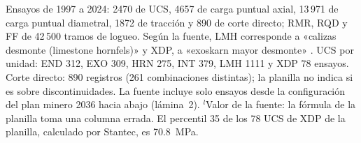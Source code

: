 \documentclass[11pt,letterpaper]{article}
\begin{document}
\begin{table}[H]
\begin{tabular}{llrrrrrrrrr}
\bottomrule\end{tabular}\par\vspace{3pt}\footnotesize Ensayos de 1997 a 2024: 2470 de UCS, 4657 de carga puntual axial, 13\,971 de carga puntual diametral, 1872 de tracción y 890 de corte directo; RMR, RQD y FF de 42\,500 tramos de logueo. Según la fuente, LMH corresponde a «calizas desmonte (limestone hornfels)» y XDP, a «exoskarn mayor desmonte» \citep[lámina~12]{antamina2025wsc}. UCS por unidad: END 312, EXO 309, HRN 275, INT 379, LMH 1111 y XDP 78 ensayos. Corte directo: 890 registros (261 combinaciones distintas); la planilla no indica si es sobre discontinuidades. La fuente incluye solo ensayos desde la configuración del plan minero 2036 hacia abajo (lámina~2). $^{l}$Valor de la fuente: la fórmula de la planilla toma una columna errada. El percentil 35 de los 78 UCS de XDP de la planilla, calculado por Stantec, es 70.8~MPa.\end{table}
\end{document}
